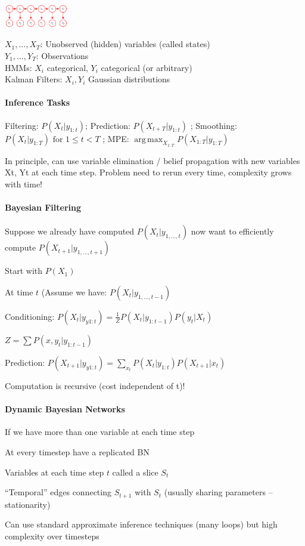 \documentclass[a4paper, 10pt]{scrartcl}
\DeclareMathOperator*{\argmax}{arg\,max}
\begin{document}
\begin{multicols*}{3}
\includegraphics[height=1cm]{img/pai4.png}

$X_1,\dots,X_T$: Unobserved (hidden) variables (called states) \\
$Y_1,\dots,Y_T$: Observations \\
HMMs: $X_i$ categorical, $Y_i$ categorical (or arbitrary)\\
Kalman Filters: $X_i, Y_i$ Gaussian distributions

\paragraph{Inference Tasks}

Filtering: $P(X_t | y_{1:t} ) $; Prediction: $P(X_{t+T} | y_{1:t} )$ ; Smoothing: $P(X_t | y_{1:T}) \text{ for } 1\leq t < T$ ; MPE: $\argmax_{X_{1:T}} P(X_{1:T} | y_{1:T})$

In principle, can use variable elimination / belief propagation with new variables Xt, Yt at
each time step. Problem need to rerun every time, complexity grows with time!

\paragraph{Bayesian Filtering}
Suppose we already have computed $P(X_t | y_{1,\dots,t})$ now want to efficiently compute $P(X_{t+1} | y_{1,...,t+1})$

\begin{compactitem}
	\item Start with $P(X_1)$
	\item At time $t$ (Assume we have:  $P(X_t | y_{1,...,t-1})$
	\item Conditioning: $P(X_t | y_{y1:t}) = \frac{1}{Z} P(X_t | y_{1:t-1})P(y_t | X_t)$
	\item $Z= \sum P(x,y_t | y_{1:t-1})$
	\item Prediction: $P(X_{t+1} | y_{y1:t}) = \sum_{x_t}  P(X_t | y_{1:t}) P(X_{t+1} | x_t)$
\end{compactitem}
Computation is recursive (cost independent of t)!

\paragraph{Dynamic Bayesian Networks}
If we have more than one variable at each time step
\begin{compactitem}
	\item At every timestep have a replicated BN
	\item Variables at each time step $t$ called a slice $S_t$
	\item ``Temporal'' edges connecting $S_{t+1}$ with $S_t$ (usually sharing parameters -- stationarity)
	\item Can use standard approximate inference techniques (many loops) but high complexity over timesteps
\end{compactitem}


\end{multicols*}
\end{document}
